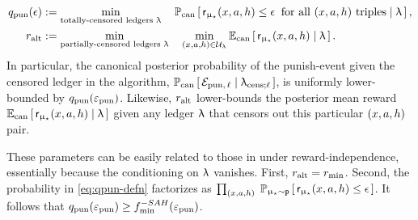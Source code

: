 
\begin{align}
q_{\mathrm{pun}}(\epsilon) &:=
    \min_{\text{totally-censored ledgers $\uplambda$}}\quad
        \operatorname{\mathbb{P}}_{\mathrm{can}}\left[\,\mathsf{r}_{\upmu_{\star}}(x,a,h) \le \epsilon \;\;
            \text{for all $(x,a,h)$ triples} \mid \uplambda\,\right],
            \label{eq:qpun-defn}\\
r_{\mathrm{alt}} &:=
    \min_{\text{partially-censored ledgers $\uplambda$}}\quad
    \min_{(x,a,h) \in \mathcal{U}_{\uplambda}}
    \mathbb{E}_{\mathrm{can}}\left[\, \mathsf{r}_{\upmu_{\star}}(x,a,h) \mid \uplambda \,\right].
        \label{eq:ralt-defn}
\end{align}
In particular, the canonical posterior probability of the punish-event given the censored ledger in the algorithm,
    $\operatorname{\mathbb{P}}_{\mathrm{can}}\left[\, \mathcal{E}_{\mathrm{pun},\,\ell}\mid \uplambda_{\mathrm{cens};\ell}\,\right]$,
is uniformly lower-bounded by $q_{\mathrm{pun}}(\varepsilon_{\mathrm{pun}})$.
Likewise, $r_{\mathrm{alt}}$ lower-bounds the posterior mean reward
    $\mathbb{E}_{\mathrm{can}}\left[\, \mathsf{r}_{\upmu_{\star}}(x,a,h) \mid \uplambda \,\right]$
given any ledger $\uplambda$ that censors out this particular $(x,a,h)$ pair.

\begin{remark}\label{rem:reduction-to-independence}
These parameters can be easily related to those in  under reward-independence, essentially because the conditioning on $\uplambda$ vanishes. First, $r_{\mathrm{alt}}=r_{\min}$. Second, the probability in \eqref{eq:qpun-defn} factorizes as
    $\prod_{\xah}\; \Prop_{\modst \sim \prior} \sbr{\sfr_{\modst}\xah \le \eps}$.
It follows that
$q_{\mathrm{pun}}(\varepsilon_{\mathrm{pun}}) \geq f_{\min}^{-SAH}(\varepsilon_{\mathrm{pun}})$.
\end{remark}

\begin{comment}where (i) the minimum is taken over all censored lends $\ledcens$ for each there exists a triple $\xah \in \reach_{\rho}(\modst)$ which appears strictly less than $\nlearn$ times, (ii) where $\calU(\ledcens)$ is the set of all triples $\xah \in \Utot$ which appear less than $\nlearn$ times in $\ledcens$, (iii) $\modpunish(\ledcens)$ is the set of models $\mu$ for which $r_{\model}\xah \le \epspunish$ for all $\xah \in\Utot \setminus \calU(\ledcens)$, and where $\Dhalnol$ is the hallucination distribution induced by drawing $\model_{\mathrm{hal}} \sim \Prcan[\cdot \mid \ledcens, \modclass(\ledcens)]$, and then imputing the rewards in $\ledcens$ as draws from its reward distirbution (as in).
\end{comment}

